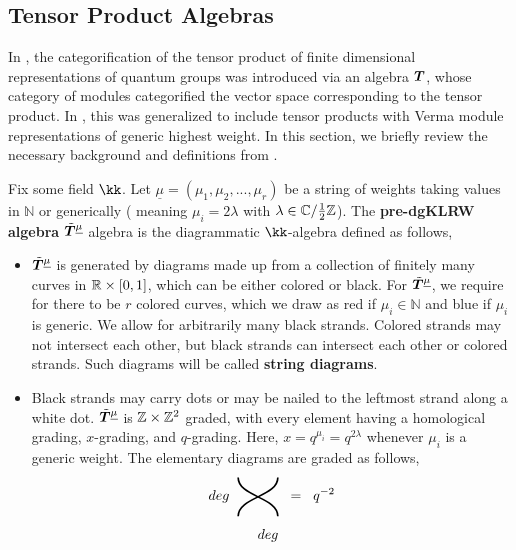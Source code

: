 \documentclass{article}
\begin{document}
\subsection{Tensor Product Algebras}\label{sec:KLRW_def}
In \cite{Web}, the categorification of the tensor product of finite dimensional representations of quantum groups was introduced via an algebra ${\boldsymbol{T}}$, whose category of modules categorified the vector space corresponding to the tensor product. In \cite{Na}, this was generalized to include tensor products with Verma module representations of generic highest weight. In this section, we briefly review the necessary background and definitions from \cite{Na}. \\
\begin{defn}
    Fix some field $\kk$. Let $\underline{\mu} = (\mu_1,\mu_2,...,\mu_r)$ be a string of weights taking values in $\mathbb{N}$ or generically ( meaning $\mu_i=2\lambda$ with $\lambda\in {\mathbb C}/\frac{1}{2}{\mathbb Z}$). The \textbf{pre-dgKLRW algebra} $\tilde{{\boldsymbol{T}}}^{\underline{\mu}}$ algebra is the diagrammatic $\kk$-algebra defined as follows,
    \begin{itemize}
        \item $\tilde{{\boldsymbol{T}}}^{\underline{\mu}}$ is generated by diagrams made up from a collection of finitely many curves in ${\mathbb R}\times [0,1]$, which can be either colored or black. For $\tilde{{\boldsymbol{T}}}^{\underline{\mu}}$, we require for there to be $r$ colored curves, which we draw as red if $\mu_i \in \mathbb{N}$ and blue if $\mu_i$ is generic. We allow for arbitrarily many black strands. Colored strands may not intersect each other, but black strands can intersect each other or colored strands. Such diagrams will be called \textbf{string diagrams}.
        \item Black strands may carry dots or may be nailed to the leftmost strand along a white dot.  $\tilde{{\boldsymbol{T}}}^{\underline{\mu}}$ is ${\mathbb Z}\times {\mathbb Z}^2$ graded, with every element having a homological grading, $x$-grading, and $q$-grading. Here, $x=q^{\mu_i} = q^{2\lambda}$ whenever $\mu_i$ is a generic weight. The elementary diagrams are graded as follows, 
        \[
        deg\hspace{2mm} \tikzdiag[scale=1]{
        \draw (1,0)..controls (1,0.5) and (0,0.5) .. (0,1);
        \draw (0,0) ..controls (0,0.5) and (1,0.5) .. (1,1);
        }\hspace{2mm} =
        \hspace{2mm} q^{-2}
        \]
        \[
       deg\hspace{2mm} \tikzdiag[scale=1]{
}\]
\end{itemize}
\end{defn}
\end{document}
